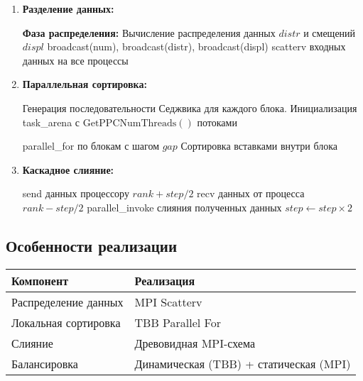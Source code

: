 \documentclass[a4paper,14pt]{extarticle}
\begin{document}
\begin{enumerate}[leftmargin=*]
    \item \textbf{Разделение данных:}
    \begin{algorithmic}[1]
        \State \textbf{Фаза распределения:}
            \State Вычисление распределения данных $distr$ и смещений $displ$
        \EndIf
        \State broadcast(num), broadcast(distr), broadcast(displ)
        \State scatterv входных данных на все процессы
    \end{algorithmic}

    \item \textbf{Параллельная сортировка:}
    \begin{algorithmic}[1]
        \State Генерация последовательности Седжвика для каждого блока.
        \State Инициализация task\_arena с $\text{GetPPCNumThreads}()$ потоками
        \begin{algorithmic}[1]
                \State parallel\_for по блокам с шагом $gap$
                \State Сортировка вставками внутри блока
            \EndFor
        \end{algorithmic}
    \end{algorithmic}

    \item \textbf{Каскадное слияние:}
    \begin{algorithmic}[1]
                \State send данных процессору $rank + step/2$
                \State recv данных от процесса $rank - step/2$
                \State parallel\_invoke слияния полученных данных
            \EndIf
            \State $step \gets step \times 2$
        \EndWhile
    \end{algorithmic}
\end{enumerate}

\subsection*{Особенности реализации}

\begin{tabular}{|l|l|}
    \hline
    \textbf{Компонент} & \textbf{Реализация} \\ \hline
    Распределение данных & MPI Scatterv \\ \hline
    Локальная сортировка & TBB Parallel For \\ \hline
    Слияние & Древовидная MPI-схема \\ \hline
    Балансировка & Динамическая (TBB) + статическая (MPI) \\ \hline
\end{tabular}
\end{document}
